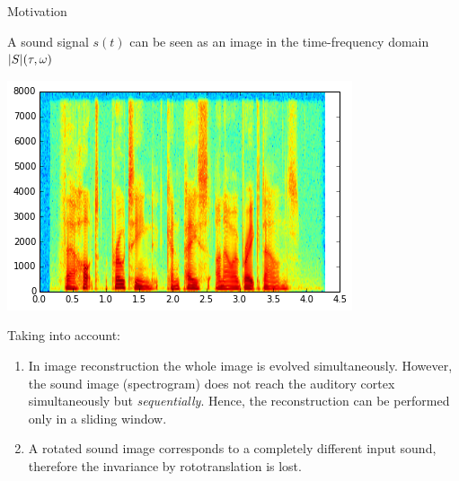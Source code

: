 \documentclass[10pt,american,ignorenonframetext,aspectratio=1610]{beamer}
\providecommand{\tightlist}{%
  \setlength{\itemsep}{0pt}\setlength{\parskip}{0pt}}
\theoremstyle{remark}
\begin{document}
\begin{frame}{Motivation}
\protect\hypertarget{motivation}{}

A sound signal \(s(t)\) can be seen as an image in the time-frequency
domain \(|S|(\tau,\omega)\)

\centering

\includegraphics[height=.7\textheight]{img/speech_spectrum.png}

\end{frame}

\begin{frame}{Taking into account:}
\protect\hypertarget{taking-into-account}{}

\begin{enumerate}
\tightlist
\item
  In image reconstruction the whole image is evolved simultaneously.
  However, the sound image (spectrogram) does not reach the auditory
  cortex simultaneously but \emph{sequentially}. Hence, the
  reconstruction can be performed only in a sliding window.
\item
  A rotated sound image corresponds to a completely different input
  sound, therefore the invariance by rototranslation is lost.
\end{enumerate}

\end{frame}
\end{document}
